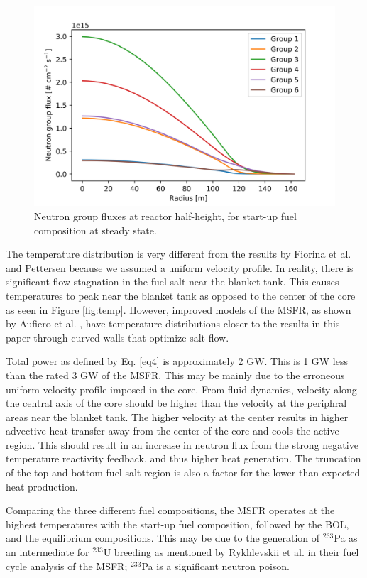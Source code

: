 \documentclass{anstrans}
\begin{document}
\begin{figure}[H] 
	\centering
	\includegraphics[width=.53\textwidth]{./figures/stflux}
	\captionsetup{justification=centering}
	\caption{Neutron group fluxes at reactor half-height, for start-up
	fuel composition at steady state.}
	\label{fig:stflux}
\end{figure} 

	The temperature distribution is very different from the results by Fiorina
	et al. \cite{fiorina_modelling_2014} and Pettersen
	\cite{pettersen_coupled_2016} because we assumed a uniform velocity
	profile. In reality, there is significant flow stagnation in the fuel salt
	near the blanket tank. This causes temperatures to peak near the blanket
	tank as opposed to the center of the core as seen in Figure \ref{fig:temp}.
	However, improved models of the \gls{MSFR}, as shown by Aufiero et al.
	\cite{aufiero_development_2014}, have temperature distributions closer to
	the results in this paper through curved walls that optimize salt flow.
	
	Total power as defined by Eq. \ref{eq4} is approximately 2 GW. This
	is 1 GW less than the rated 3 GW of the \gls{MSFR}. This may be mainly due
	to the erroneous uniform velocity profile imposed in the core. From
	fluid dynamics, velocity along the central axis of the core should be
	higher than the velocity at the periphral areas near the blanket tank.
	The higher velocity at the center results in higher advective heat transfer
	away from the center of the core and cools the active region. This should
	result in an increase in neutron flux from the strong negative
	temperature reactivity feedback, and thus higher heat generation. The
	truncation of the top and bottom fuel salt region is also a factor for
	the lower than expected heat production.
	
	Comparing the three different fuel compositions, the \gls{MSFR} operates at
	the highest temperatures with the start-up fuel composition, followed by
	the \gls{BOL}, and the equilibrium compositions. This may be due to the
	generation of $^{233}$Pa as an intermediate for $^{233}$U breeding as
	mentioned by Rykhlevskii et al. \cite{rykhlevskii_fuel_2019} in their fuel cycle analysis
	of the \gls{MSFR}; $^{233}$Pa is a significant neutron poison.
\end{document}
